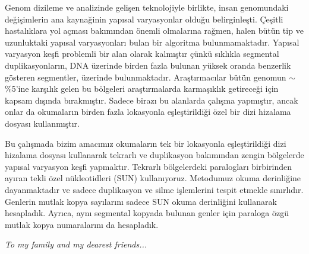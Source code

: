 \documentclass{buthesis}
\begin{document}
\begin{ozet}
Genom dizileme ve analizinde geli\c{s}en teknolojiyle birlikte, insan genomundaki de\u{g}i\c{s}imlerin ana kayna\u{g}inin yap{\i}sal varyasyonlar oldu\u{g}u belirginle\c{s}ti. \c{C}e\c{s}itli hastal{\i}klara yol a\c{c}mas{\i} bak{\i}m{\i}ndan \"{o}nemli olmalar{\i}na ra\u{g}men, halen b\"{u}t\"{u}n tip ve uzunluktaki yap{\i}sal varyasyonlar{\i} bulan bir algoritma bulunmamaktad{\i}r. Yap{\i}sal varyasyon ke\c{s}fi problemli bir alan olarak kalm{\i}\c{s}t{\i}r \c{c}\"{u}nk\"{u} s{\i}kl{\i}kla segmental duplikasyonlar{\i}n, DNA \"{u}zerinde birden fazla bulunan y\"{u}ksek oranda benzerlik g\"{o}steren segmentler, \"{u}zerinde bulunmaktad{\i}r. Ara\c{s}t{\i}rmac{\i}lar b\"{u}t\"{u}n genomun $\sim$\%5'ine kar\c{s}{\i}l{\i}k gelen bu b\"{o}lgeleri ara\c{s}t{\i}rmalarda karma\c{s}{\i}kl{\i}k getirece\u{g}i i\c{c}in kapsam d{\i}\c{s}{\i}nda b{\i}rakm{\i}\c{s}t{\i}r. Sadece biraz{\i} bu alanlarda \c{c}al{\i}\c{s}ma yapm{\i}\c{s}t{\i}r, ancak onlar da okumalar{\i}n birden fazla lokasyonla e\c{s}le\c{s}tirildi\u{g}i \"{o}zel bir dizi hizalama dosyas{\i} kullanm{\i}\c{s}t{\i}r.

Bu \c{c}al{\i}\c{s}mada bizim amac{\i}m{\i}z okumalar{\i}n tek bir lokasyonla e\c{s}le\c{s}tirildi\u{g}i dizi hizalama dosyas{\i} kullanarak tekrarl{\i} ve duplikasyon bak{\i}m{\i}ndan zengin b\"{o}lgelerde yap{\i}sal varyasyon ke\c{s}fi yapmakt{\i}r. Tekrarl{\i} b\"{o}lgelerdeki paraloglar{\i} birbirinden ay{\i}ran tekli \"{o}zel n\"{u}kleotidleri (SUN) kullan{\i}yoruz. Metodumuz okuma derinli\u{g}ine dayanmaktad{\i}r ve sadece duplikasyon ve silme i\c{s}lemlerini tespit etmekle s{\i}n{\i}rl{\i}d{\i}r. Genlerin mutlak kopya say{\i}lar{\i}n{\i} sadece SUN okuma derinli\u{g}ini kullanarak hesaplad{\i}k. Ayr{\i}ca, ayn{\i} segmental kopyada bulunan genler i\c{c}in paraloga \"{o}zg\"{u} mutlak kopya numaralar{\i}n{\i} da hesaplad{\i}k.
\end{ozet}

\clearpage
\begin{center}
    \thispagestyle{empty}
    \vspace*{\fill}
    \textit{To my family and my dearest friends...}
    \vspace*{\fill}
\end{center}
\clearpage

\tableofcontents
\listoffigures
\listoftables
\listofalgorithms
\newpage
\newpage
%
\newpage 
\pagestyle{headings}
\makeatother
\end{document}
